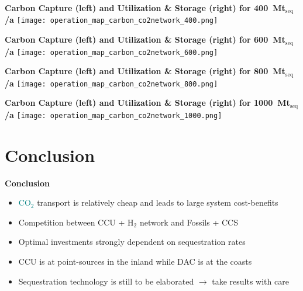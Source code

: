 \documentclass[12pt, aspectratio=169]{beamer}
\newcommand{\carbon}{\textcolor{teal}{CO$_2$}}
\newcommand{\hydrogen}{H$_2$}
\begin{document}
\begin{frame}
    \textbf{Carbon Capture (left) and Utilization \& Storage (right) for 400~Mt$_{\text{seq}}$/a}
    \texttt{[image: operation\_map\_carbon\_co2network\_400.png]}
\end{frame}

\begin{frame}
    \textbf{Carbon Capture (left) and Utilization \& Storage (right) for 600~Mt$_{\text{seq}}$/a}
    \texttt{[image: operation\_map\_carbon\_co2network\_600.png]}
\end{frame}

\begin{frame}
    \textbf{Carbon Capture (left) and Utilization \& Storage (right) for 800~Mt$_{\text{seq}}$/a}
    \texttt{[image: operation\_map\_carbon\_co2network\_800.png]}
\end{frame}

\begin{frame}
    \textbf{Carbon Capture (left) and Utilization \& Storage (right) for 1000~Mt$_{\text{seq}}$/a}
    \texttt{[image: operation\_map\_carbon\_co2network\_1000.png]}
\end{frame}


\section*{Conclusion}

\begin{frame}
    \textbf{Conclusion}
    \begin{itemize}
        \pause
        \item \carbon{} transport is relatively cheap and leads to large system cost-benefits
              \pause
        \item Competition between CCU + \hydrogen{} network and Fossils + CCS
              \pause
        \item Optimal investments strongly dependent on sequestration rates
              \pause
        \item CCU is at point-sources in the inland while DAC is at the coasts
              \pause
        \item Sequestration technology is still to be elaborated $\rightarrow$ take results with care
    \end{itemize}
\end{frame}
\end{document}
